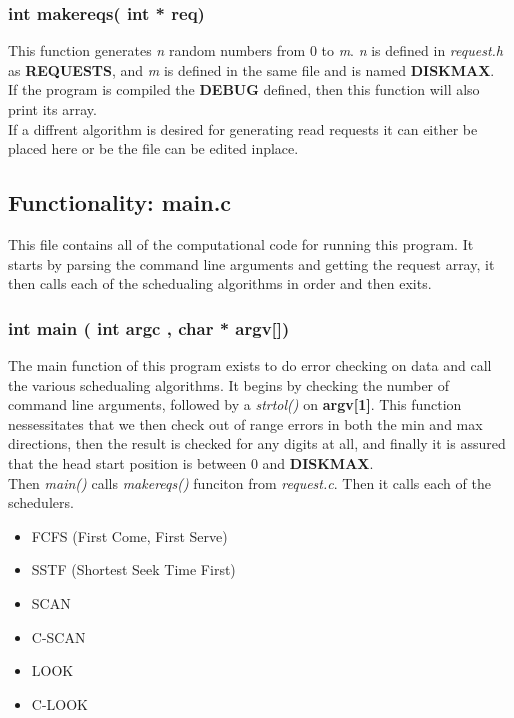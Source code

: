 \documentclass[11pt]{article}
\begin{document}
\subsubsection{ int make\textunderscore reqs( int * req) }

This function generates \textit{n} random numbers from 0 to \textit{m}. \textit{n} is defined in \textit{request.h} as \textbf{REQUESTS}, and \textit{m} is defined in the same file and is named \textbf{DISK\textunderscore MAX}.
\\
If the program is compiled the \textbf{DEBUG} defined, then this function will also print its array.
\\
If a diffrent algorithm is desired for generating read requests it can either be
placed here or be the file can be edited inplace.
\vfill

\subsection{ Functionality: main.c}
This file contains all of the computational code for running this program. It starts by parsing the command line arguments and getting the request array, it then calls each of the schedualing algorithms in order and then exits.

\subsubsection { int main ( int argc , char * argv[])}

The main function of this program exists to do error checking on data and call the various schedualing algorithms. It begins by checking the number of command line arguments, followed by a \textit{strtol()} on \textbf{argv[1]}. This function nessessitates that we then check out of range errors in both the min and max directions, then the result is checked for any digits at all, and finally it is assured that the head start position is between 0 and \textbf{DISK\textunderscore MAX}.
\\
Then \textit{main()} calls \textit{ make\textunderscore reqs()} funciton from \textit{request.c}. Then it calls each of the schedulers.
\begin{itemize}
\item FCFS (First Come, First Serve)
\item SSTF (Shortest Seek Time First)
\item SCAN
\item C-SCAN
\item LOOK
\item C-LOOK
\end{itemize}
\end{document}
